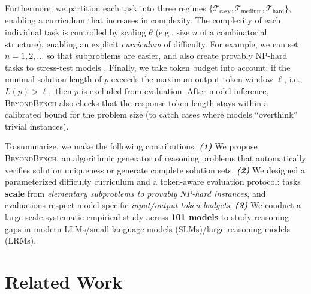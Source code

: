 \documentclass{article} %
\theoremstyle{plain}
\theoremstyle{definition}
\newcommand{\our}{\textsc{BeyondBench}\xspace}
\begin{document}
Furthermore, we partition each task into three regimes $\{\mathcal{T}_\text{easy},\mathcal{T}_\text{medium},\mathcal{T}_\text{hard}\}$, enabling a curriculum that increases in complexity. The complexity of each individual task is controlled by scaling $\theta$ (e.g., size $n$ of a combinatorial structure), enabling an explicit \emph{curriculum} of difficulty. For example, we can set $n=1,2,\dots$ so that subproblems are easier, and also create provably NP-hard tasks to stress-test models \citep{hidalgo2013comparing}. Finally, we take token budget into account: if the minimal solution length of $p$ exceeds the maximum output token window $\ell$, i.e., $L(p) > \ell,$ then $p$ is excluded from evaluation. After model inference, \our also checks that the response token length stays within a calibrated bound for the problem size (to catch cases where models “overthink” \citep{chen2025think23overthinkingo1like, cuadron2025dangeroverthinkingexaminingreasoningaction} trivial instances).



To summarize, we make the following contributions: \textbf{\textit{(1)}} We propose \our, an algorithmic generator of reasoning problems that automatically verifies solution uniqueness or generate complete solution sets. \textbf{\textit{(2)}} We designed a parameterized difficulty curriculum and a token-aware evaluation protocol: tasks \textbf{scale} from \textit{elementary subproblems to provably NP-hard instances}, and evaluations respect model-specific \textit{input/output token budgets}; \textbf{\textit{(3)}} We conduct a large-scale systematic empirical study across \textbf{101 models} to study reasoning gaps in modern LLMs/small language models (SLMs)/large reasoning models (LRMs).


\section{Related Work}  
\end{document}
